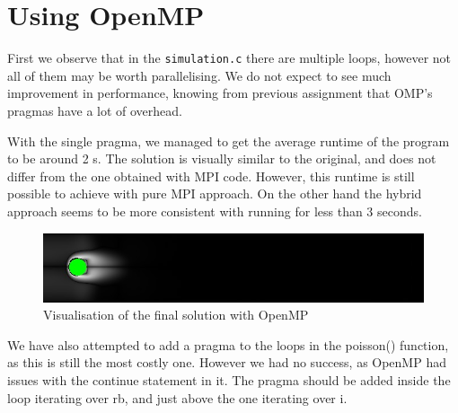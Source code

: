 \documentclass[11pt,journal]{article}
\begin{document}
	\section{Using OpenMP}
	First we observe that in the \texttt{simulation.c} there are multiple loops, however not all of them may be worth parallelising. We do not expect to see much improvement in performance, knowing from previous assignment that OMP's pragmas have a lot of overhead.
	
	With the single pragma, we managed to get the average runtime of the program to be around 2 s. The solution is visually similar to the original, and does not differ from the one obtained with MPI code. However, this runtime is still possible to achieve with pure MPI approach. On the other hand the hybrid approach seems to be more consistent with running for less than 3 seconds.
	
	\begin{figure}[h]
		\centering
		\includegraphics[scale=0.7]{karman_omp2.jpg}
		\caption{Visualisation of the final solution with OpenMP}
	\end{figure}

	We have also attempted to add a pragma to the loops in the poisson() function, as this is still the most costly one. However we had no success, as OpenMP had issues with the continue statement in it. The pragma should be added inside the loop iterating over rb, and just above the one iterating over i.
	

\end{document}

